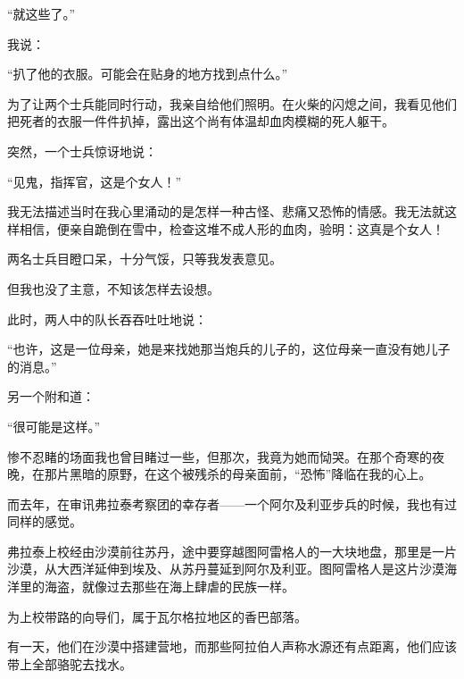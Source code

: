 \documentclass{article}
\begin{document}
“就这些了。”



我说：



“扒了他的衣服。可能会在贴身的地方找到点什么。”



为了让两个士兵能同时行动，我亲自给他们照明。在火柴的闪熄之间，我看见他们把死者的衣服一件件扒掉，露出这个尚有体温却血肉模糊的死人躯干。



突然，一个士兵惊讶地说：



“见鬼，指挥官，这是个女人！”



我无法描述当时在我心里涌动的是怎样一种古怪、悲痛又恐怖的情感。我无法就这样相信，便亲自跪倒在雪中，检查这堆不成人形的血肉，验明：这真是个女人！



两名士兵目瞪口呆，十分气馁，只等我发表意见。



但我也没了主意，不知该怎样去设想。



此时，两人中的队长吞吞吐吐地说：



“也许，这是一位母亲，她是来找她那当炮兵的儿子的，这位母亲一直没有她儿子的消息。”



另一个附和道：



“很可能是这样。”



惨不忍睹的场面我也曾目睹过一些，但那次，我竟为她而恸哭。在那个奇寒的夜晚，在那片黑暗的原野，在这个被残杀的母亲面前，“恐怖”降临在我的心上。



而去年，在审讯弗拉泰考察团的幸存者——一个阿尔及利亚步兵的时候，我也有过同样的感觉。



弗拉泰上校经由沙漠前往苏丹，途中要穿越图阿雷格人的一大块地盘，那里是一片沙漠，从大西洋延伸到埃及、从苏丹蔓延到阿尔及利亚。图阿雷格人是这片沙漠海洋里的海盗，就像过去那些在海上肆虐的民族一样。



为上校带路的向导们，属于瓦尔格拉地区的香巴部落。



有一天，他们在沙漠中搭建营地，而那些阿拉伯人声称水源还有点距离，他们应该带上全部骆驼去找水。
\end{document}
